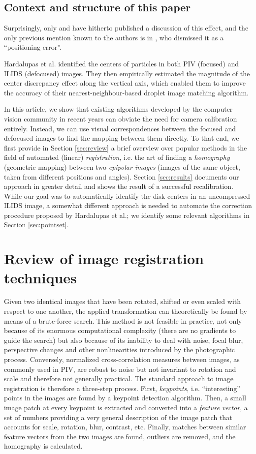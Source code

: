 \documentclass[preprint]{elsarticle}
\begin{document}
\subsection{Context and structure of this paper}
Surprisingly, only \citet{Hardalupas10a} and \citet{Hardalupas10} have hitherto published a discussion of
this effect, and the only previous mention known to the authors is in
\citet{Kurosawa02}, who dismissed it as a ``positioning error''.

Hardalupas et al. identified the centers of particles in both PIV
(focused) and ILIDS (defocused) images. They then empirically estimated the
magnitude of the center discrepancy effect along the vertical axis, which
enabled them to improve the accuracy of their nearest-neighbour-based droplet
image matching algorithm.

In this article, we show that existing algorithms developed by the computer
vision community in recent years can obviate the need for camera calibration entirely.
Instead, we can use visual correspondences between the focused and defocused
images to find the mapping between them directly. To that end, we first provide
in Section \ref{sec:review} a brief overview over popular methods in the field of automated (linear)
\emph{registration}, i.e. the art of finding a \emph{homography} (geometric
mapping) between two \emph{epipolar images} (images of the same object, taken
from different positions and angles). Section \ref{sec:results} documents 
our approach in greater detail and shows the result of a successful
recalibration. While our goal was to automatically identify the disk centers in
an uncompressed ILIDS image, a somewhat different approach is needed to automate the
correction procedure proposed by Hardalupas et al.; we identify some
relevant algorithms in Section \ref{sec:pointset}.

\section{Review of image registration techniques \label{sec:review}} Given two
identical images that have been rotated, shifted or even scaled with respect to
one another, the applied transformation can theoretically be found by means of a
brute-force search. This method is not feasible in practice, not only because of
its enormous computational complexity (there are no gradients to guide the
search) but also because of its inability to deal with noise, focal blur,
perspective changes and other nonlinearities introduced by the photographic
process. Conversely, normalized cross-correlation measures between images, as
commonly used in PIV, are robust to noise but not invariant to rotation and
scale and therefore not generally practical. The standard approach to image
registration is therefore a three-step process. First, \emph{keypoints}, i.e.
``interesting'' points in the images are found by a keypoint detection
algorithm.  Then, a small image patch at every keypoint is extracted and
converted into a \emph{feature vector}, a set of numbers providing a very
general description of the image patch that accounts for scale, rotation, blur,
contrast, etc. Finally, matches between similar feature vectors from the two
images are found, outliers are removed, and the homography is calculated.
\end{document}
